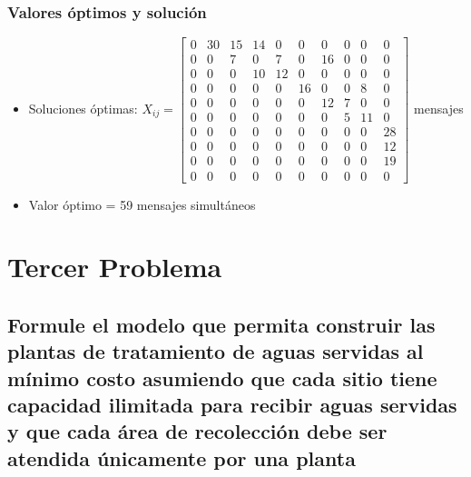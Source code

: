 \documentclass[a4paper,12pt]{article}
\begin{document}
\subsubsection{Valores óptimos y solución}
\begin{itemize}
	\item Soluciones óptimas: $X_{ij}=
	\begin{bmatrix}
		0 & 30 & 15 & 14 & 0 & 0 & 0 & 0 & 0 & 0\\
		0 & 0 & 7 & 0 & 7 & 0 & 16 & 0 & 0 & 0\\
		0 & 0 & 0 & 10 & 12 & 0 & 0 & 0 & 0 & 0\\
		0 & 0 & 0 & 0 & 0 & 16 & 0 & 0 & 8 & 0\\
		0 & 0 & 0 & 0 & 0 & 0 & 12 & 7 & 0 & 0\\
		0 & 0 & 0 & 0 & 0 & 0 & 0 & 5 & 11 & 0\\
		0 & 0 & 0 & 0 & 0 & 0 & 0 & 0 & 0 & 28\\
		0 & 0 & 0 & 0 & 0 & 0 & 0 & 0 & 0 & 12\\
		0 & 0 & 0 & 0 & 0 & 0 & 0 & 0 & 0 & 19\\
		0 & 0 & 0 & 0 & 0 & 0 & 0 & 0 & 0 & 0
	\end{bmatrix}$ mensajes
	\item Valor óptimo = 59 mensajes simultáneos
\end{itemize}
\section{Tercer Problema}
\subsection{Formule  el  modelo  que  permita  construir  las  plantas de  tratamiento  de  aguas  servidas  al  mínimo  costo  asumiendo  que  cada  sitio  tiene  capacidad  ilimitada para  recibir  aguas  servidas  y  que  cada  área  de  recolección debe ser atendida únicamente por una planta}
\end{document}
